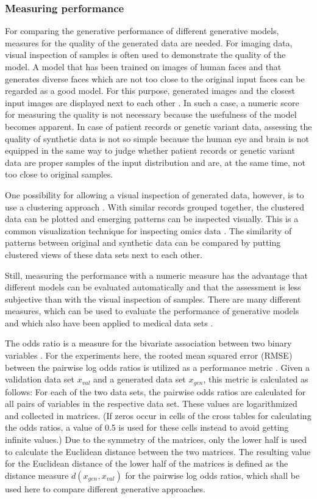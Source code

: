 \documentclass[12pt]{article}
\begin{document}
\subsubsection{Measuring performance}\label{measuringperformance}
For comparing the generative performance of different generative models, measures for the quality of the generated data are needed.
For imaging data, visual inspection of samples is often used  to demonstrate the quality of the model.
A model that has been trained on images of human faces and that generates diverse faces which are not too close to the original input faces can be regarded as a good model.
For this purpose, generated images and the closest input images are displayed next to each other \citep{theis_note_2015}.
In such a case, a numeric score for measuring the quality is not necessary because the usefulness of the model becomes apparent.
In case of patient records or genetic variant data, assessing the quality of synthetic data is not so simple because the human eye and brain is not equipped in the same way to judge whether patient records or genetic variant data are proper samples of the input distribution and are, at the same time, not too close to original samples.

One possibility for allowing a visual inspection of generated data, however, is to use a clustering approach \citep{hclust}.
With similar records grouped together, the clustered data can be plotted and emerging patterns can be inspected visually.
This is a common visualization technique for inspecting omics data \citep{eisen_cluster_1998}.
The similarity of patterns between original and synthetic data can be compared by putting clustered views of these data sets next to each other.

Still, measuring the performance with a numeric measure has the advantage that different models can be evaluated automatically and that the assessment is less subjective than with the visual inspection of samples.
There are many different measures, which can be used to evaluate the performance of generative models and which also have been applied to medical data sets \citep{goncalves}.

The odds ratio is a measure for the bivariate association between two binary variables \citep{blandaltmannodds}.
For the experiments here, the rooted mean squared error (RMSE) between the pairwise log odds ratios is utilized as a performance metric \citep{nussberger_synthetic_2020}.
Given a validation data set $x_{val}$ and a generated data set $x_{gen}$, this metric is calculated as follows:
For each of the two data sets, the pairwise odds ratios are calculated for all pairs of variables in the respective data set.
These values are logarithmized and collected in matrices.
(If zeros occur in cells of the cross tables for calculating the odds ratios, a value of 0.5 is used for these cells instead to avoid getting infinite values.)
Due to the symmetry of the matrices, only the lower half is used to calculate the Euclidean distance between the two matrices.
The resulting value for the Euclidean distance of the lower half of the matrices is defined as the distance measure $d(x_{gen}, x_{val})$ for the pairwise log odds ratios, which shall be used here to compare different generative approaches.
\end{document}

